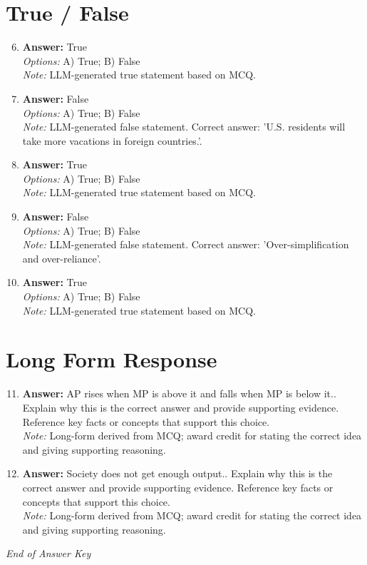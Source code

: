 \documentclass[12pt]{article}
\begin{document}
\section*{True / False}
\begin{enumerate}[label=\arabic*.]
\setcounter{enumi}{5}
\item \textbf{Answer:} True
\\ \textit{Options:} A) True; B) False
\\ \textit{Note:} LLM-generated true statement based on MCQ.
\item \textbf{Answer:} False
\\ \textit{Options:} A) True; B) False
\\ \textit{Note:} LLM-generated false statement. Correct answer: 'U.S. residents will take more vacations in foreign countries.'.
\item \textbf{Answer:} True
\\ \textit{Options:} A) True; B) False
\\ \textit{Note:} LLM-generated true statement based on MCQ.
\item \textbf{Answer:} False
\\ \textit{Options:} A) True; B) False
\\ \textit{Note:} LLM-generated false statement. Correct answer: 'Over-simplification and over-reliance'.
\item \textbf{Answer:} True
\\ \textit{Options:} A) True; B) False
\\ \textit{Note:} LLM-generated true statement based on MCQ.
\end{enumerate}

\section*{Long Form Response}
\begin{enumerate}[label=\arabic*.]
\setcounter{enumi}{10}
\item \textbf{Answer:} AP rises when MP is above it and falls when MP is below it.. Explain why this is the correct answer and provide supporting evidence. Reference key facts or concepts that support this choice.
\\ \textit{Note:} Long-form derived from MCQ; award credit for stating the correct idea and giving supporting reasoning.
\item \textbf{Answer:} Society does not get enough output.. Explain why this is the correct answer and provide supporting evidence. Reference key facts or concepts that support this choice.
\\ \textit{Note:} Long-form derived from MCQ; award credit for stating the correct idea and giving supporting reasoning.
\end{enumerate}

\vfill
\noindent\textit{End of Answer Key}
\end{document}
